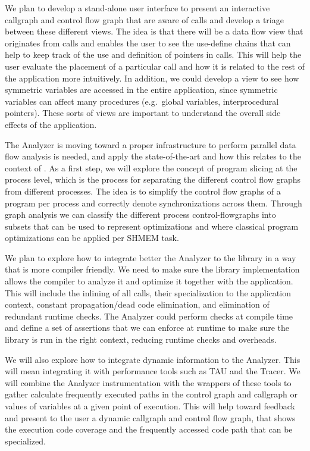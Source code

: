 We plan to develop a stand-alone user interface to present an
interactive callgraph and control flow graph that are aware of
\openshmem calls and develop a triage between these different views.
The idea is that there will be a data flow view that originates from
\openshmem calls and enables the user to see the use-define chains that
can help to keep track of the use and definition of pointers in
\openshmem calls. This will help the user evaluate the placement of a
particular call and how it is related to the rest of the application
more intuitively.  In addition, we could develop a view to see how
symmetric variables are accessed in the entire application, since
symmetric variables can affect many procedures (e.g.\ global variables,
interprocedural pointers). These sorts of views are important to
understand the overall side effects of the application.

The \openshmem Analyzer is moving toward a proper infrastructure to
perform parallel data flow analysis is needed, and apply the
state-of-the-art and how this relates to the context of \openshmem. As
a first step, we will explore the concept of program slicing at the
process level, which is the process for separating the different
control flow graphs from different processes. The idea is to simplify
the control flow graphs of a program per process and correctly denote
synchronizations across them. Through graph analysis we can classify
the different process control-flowgraphs into subsets that can be used
to represent optimizations and where classical program optimizations
can be applied per SHMEM task.

We plan to explore how to integrate better the \openshmem Analyzer to
the \openshmem library in a way that is more compiler friendly. We need
to make sure the library implementation allows the compiler to analyze
it and optimize it together with the application. This will include
the inlining of all \openshmem calls, their specialization to the
application context, constant propagation/dead code elimination, and
elimination of redundant runtime checks. The \openshmem Analyzer could
perform checks at compile time and define a set of assertions that we
can enforce at runtime to make sure the library is run in the right
context, reducing runtime checks and overheads.

We will also explore how to integrate dynamic information to the
\openshmem Analyzer. This will mean integrating it with performance
tools such as TAU and the \openshmem Tracer. We will combine the
\openshmem Analyzer instrumentation with the \openshmem wrappers of
these tools to gather calculate frequently executed paths in the
control graph and callgraph or values of variables at a given point of
execution. This will help toward feedback and present to the user a
dynamic callgraph and control flow graph, that shows the execution
code coverage and the frequently accessed code path that can be
specialized.


